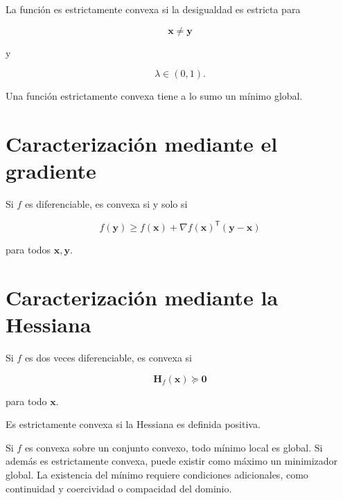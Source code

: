 \documentclass[
  spanish,
  10.5pt,
  letterpaper,
  DIV=11,
  numbers=noendperiod,
  oneside,
  open=any]{scrreprt}
\theoremstyle{definition}
\theoremstyle{definition}
\theoremstyle{plain}
\theoremstyle{remark}
\begin{document}

La función es estrictamente convexa si la desigualdad es estricta para

\[
\mathbf{x}\neq\mathbf{y}
\]

y

\[
\lambda\in(0,1).
\]

Una función estrictamente convexa tiene a lo sumo un mínimo global.

\section*{Caracterización mediante el
gradiente}\label{caracterizaciuxf3n-mediante-el-gradiente}


Si \(f\) es diferenciable, es convexa si y solo si

\[
f(\mathbf{y})
\geq
f(\mathbf{x})
+
\nabla f(\mathbf{x})^{\mathsf T}
(\mathbf{y}-\mathbf{x})
\]

para todos \(\mathbf{x},\mathbf{y}\).

\section*{Caracterización mediante la
Hessiana}\label{caracterizaciuxf3n-mediante-la-hessiana}


Si \(f\) es dos veces diferenciable, es convexa si

\[
\mathbf{H}_f(\mathbf{x})
\succeq
\mathbf{0}
\]

para todo \(\mathbf{x}\).

Es estrictamente convexa si la Hessiana es definida positiva.

\begin{tcolorbox}[enhanced jigsaw, arc=.35mm, bottomrule=.15mm, bottomtitle=1mm, breakable, colback=white, colbacktitle=quarto-callout-note-color!10!white, colframe=quarto-callout-note-color-frame, coltitle=black, left=2mm, leftrule=.75mm, opacityback=0, opacitybacktitle=0.6, rightrule=.15mm, title=\textcolor{quarto-callout-note-color}{\faInfo}\hspace{0.5em}{Convexidad y mínimos globales}, titlerule=0mm, toprule=.15mm, toptitle=1mm]

Si \(f\) es convexa sobre un conjunto convexo, todo mínimo local es
global. Si además es estrictamente convexa, puede existir como máximo un
minimizador global. La existencia del mínimo requiere condiciones
adicionales, como continuidad y coercividad o compacidad del dominio.

\end{tcolorbox}
\end{document}
